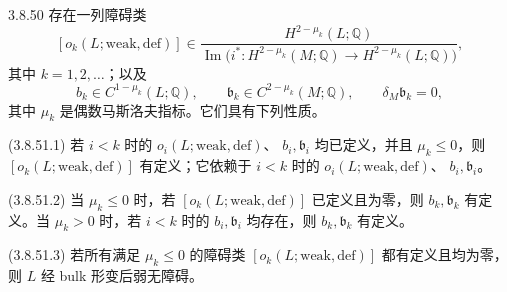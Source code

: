 \begin{theorem}{3.8.50}\label{thm:3-8-50}
存在一列障碍类
\[
 [o_k(L;\mathrm{weak,def})]
 \in
 \frac{H^{2-\mu_k}(L;\mathbb Q)}
 {\operatorname{Im}\bigl(
 i^*\colon H^{2-\mu_k}(M;\mathbb Q)
 \longrightarrow H^{2-\mu_k}(L;\mathbb Q)
 \bigr)},
\]
其中 $k=1,2,\ldots$；以及
\[
 b_k\in C^{1-\mu_k}(L;\mathbb Q),
 \qquad
 \mathfrak b_k\in C^{2-\mu_k}(M;\mathbb Q),
 \qquad
 \delta_M\mathfrak b_k=0,
\]
其中 $\mu_k$ 是偶数马斯洛夫指标。它们具有下列性质。

\smallskip
\noindent\textup{(3.8.51.1)}
若 $i<k$ 时的 $o_i(L;\mathrm{weak,def})$、
$b_i,\mathfrak b_i$ 均已定义，并且 $\mu_k\leq0$，则
$[o_k(L;\mathrm{weak,def})]$ 有定义；它依赖于
$i<k$ 时的 $o_i(L;\mathrm{weak,def})$、
$b_i,\mathfrak b_i$。

\noindent\textup{(3.8.51.2)}
当 $\mu_k\leq0$ 时，若
$[o_k(L;\mathrm{weak,def})]$ 已定义且为零，则
$b_k,\mathfrak b_k$ 有定义。当 $\mu_k>0$ 时，若
$i<k$ 时的 $b_i,\mathfrak b_i$ 均存在，则
$b_k,\mathfrak b_k$ 有定义。

\noindent\textup{(3.8.51.3)}
若所有满足 $\mu_k\leq0$ 的障碍类
$[o_k(L;\mathrm{weak,def})]$ 都有定义且均为零，则
$L$ 经 bulk 形变后弱无障碍。
\end{theorem}

